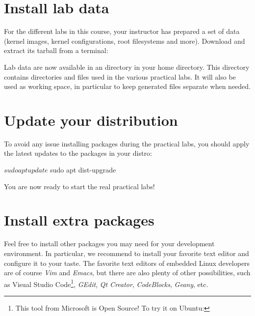 
\section{Install lab data}

For the different labs in this course, your instructor has prepared a
set of data (kernel images, kernel configurations, root filesystems
and more). Download and extract its tarball from a terminal:

Lab data are now available in an  directory in
your home directory. This directory contains directories and files used in
the various practical labs. It will also be used as working space,
in particular to keep generated files separate when needed.

\section{Update your distribution}

To avoid any issue installing packages during the practical labs,
you should apply the latest updates to the packages in your distro:

\begin{bashinput}
$ sudo apt update
$ sudo apt dist-upgrade
\end{bashinput}

You are now ready to start the real practical labs!

\section{Install extra packages}

Feel free to install other packages you may need for your development
environment. In particular, we recommend to install your favorite text
editor and configure it to your taste. The favorite text editors of
embedded Linux developers are of course {\em Vim} and {\em Emacs}, but
there are also plenty of other possibilities, such as {Visual Studio
Code}\footnote{This tool from Microsoft is Open Source! To try it on
Ubuntu: }, {\em GEdit},
{\em Qt Creator}, {\em CodeBlocks}, {\em Geany}, etc.

